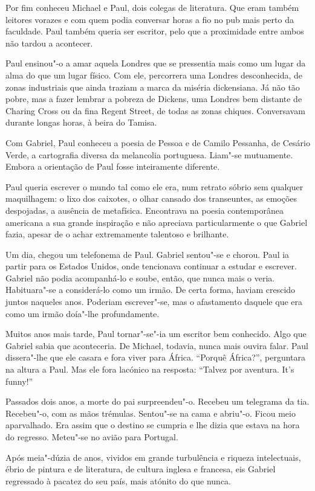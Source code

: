Por fim conheceu Michael e Paul, dois colegas de literatura. Que eram
também leitores vorazes e com quem podia conversar horas a fio no pub
mais perto da faculdade. Paul também queria ser escritor, pelo que a
proximidade entre ambos não tardou a acontecer.

Paul ensinou"-o a amar aquela Londres que se pressentia mais como um
lugar da alma do que um lugar físico. Com ele, percorrera uma Londres
desconhecida, de zonas industriais que ainda traziam a marca da miséria
dickensiana. Já não tão pobre, mas a fazer lembrar a pobreza de Dickens,
uma Londres bem distante de Charing Cross ou da fina Regent Street, de
todas as zonas chiques. Conversavam durante longas horas, à beira do
Tamisa.

Com Gabriel, Paul conheceu a poesia de Pessoa e de Camilo Pessanha, de
Cesário Verde, a cartografia diversa da melancolia portuguesa. Liam"-se
mutuamente. Embora a orientação de Paul fosse inteiramente diferente.

Paul queria escrever o mundo tal como ele era, num retrato sóbrio sem
qualquer maquilhagem: o lixo dos caixotes, o olhar cansado dos
transeuntes, as emoções despojadas, a ausência de metafísica. Encontrava
na poesia contemporânea americana a sua grande inspiração e não
apreciava particularmente o que Gabriel fazia, apesar de o achar
extremamente talentoso e brilhante.

Um dia, chegou um telefonema de Paul. Gabriel sentou"-se e chorou. Paul
ia partir para os Estados Unidos, onde tencionava continuar a estudar e
escrever. Gabriel não podia acompanhá-lo e soube, então, que nunca mais
o veria. Habituara"-se a considerá-lo como um irmão. De certa forma,
haviam crescido juntos naqueles anos. Poderiam escrever"-se, mas o
afastamento daquele que era como um irmão doía"-lhe profundamente.

Muitos anos mais tarde, Paul tornar"-se"-ia um escritor bem conhecido.
Algo que Gabriel sabia que aconteceria. De Michael, todavia, nunca mais
ouvira falar. Paul dissera"-lhe que ele casara e fora viver para África.
``Porquê África?'', perguntara na altura a Paul. Mas ele fora lacónico na
resposta: ``Talvez por aventura. It's funny!''

Passados dois anos, a morte do pai surpreendeu"-o. Recebeu um telegrama
da tia. Recebeu"-o, com as mãos trémulas. Sentou"-se na cama e abriu"-o.
Ficou meio aparvalhado. Era assim que o destino se cumpria e lhe dizia
que estava na hora do regresso. Meteu"-se no avião para Portugal.

Após meia"-dúzia de anos, vividos em grande turbulência e riqueza
intelectuais, ébrio de pintura e de literatura, de cultura inglesa e
francesa, eis Gabriel regressado à pacatez do seu país, mais atónito do
que nunca.

